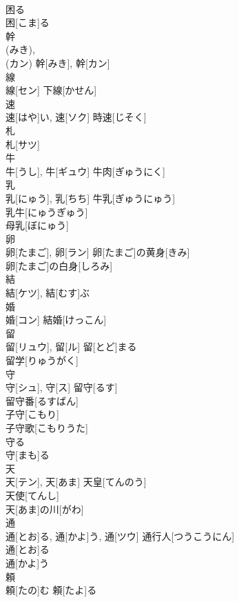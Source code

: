 \documentclass[8pt]{extreport}
\begin{document}
\begin{CJK}{UTF8}{min}
\\	困る	
\\	困[こま]る	
\\	幹	
\\	(みき), 
\\	(カン)	幹[みき], 幹[カン]	
\\	線	
\\	線[セン]	下線[かせん] 
\\	速	
\\	速[はや]い, 速[ソク]	時速[じそく] 
\\	札	
\\	札[サツ]	
\\	牛	
\\	牛[うし], 牛[ギュウ]	牛肉[ぎゅうにく] 
\\	乳	
\\	乳[にゅう], 乳[ちち]	牛乳[ぎゅうにゅう] 
\\	乳牛[にゅうぎゅう] 
\\	母乳[ぼにゅう] 
\\	卵	
\\	卵[たまご], 卵[ラン]	卵[たまご]の黄身[きみ] 
\\	卵[たまご]の白身[しろみ] 
\\	結	
\\	結[ケツ], 結[むす]ぶ	
\\	婚	
\\	婚[コン]	結婚[けっこん] 
\\	留	
\\	留[リュウ], 留[ル]	留[とど]まる 
\\	留学[りゅうがく] 
\\	守	
\\	守[シュ], 守[ス]	留守[るす] 
\\	留守番[るすばん] 
\\	子守[こもり] 
\\	子守歌[こもりうた] 
\\	守る	
\\	守[まも]る	
\\	天	
\\	天[テン], 天[あま]	天皇[てんのう] 
\\	天使[てんし] 
\\	天[あま]の川[がわ] 
\\	通	
\\	通[とお]る, 通[かよ]う, 通[ツウ]	通行人[つうこうにん] 
\\	通[とお]る 
\\	通[かよ]う 
\\	頼	
\\	頼[たの]む	頼[たよ]る 

\end{CJK}
\end{document}
